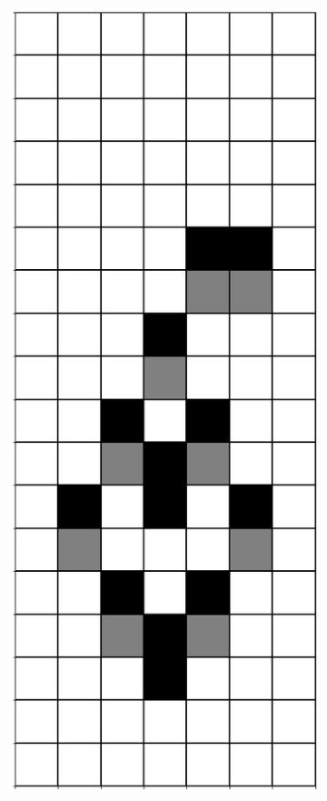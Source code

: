 \documentclass[12pt]{article}
\numberwithin{figure}{section} %
\begin{document}
   \begin{figure}[H]\ContinuedFloat
       \begin{subfigure}{0.19\textwidth}
     \centering
     \includegraphics[width=\linewidth]{Section4/18.0}

\end{subfigure}
\end{figure}
\end{document}
